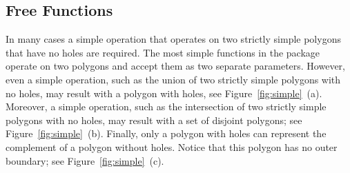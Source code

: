 
%
% 
% 
%

\subsection{Free Functions}
\label{bobs_ssec:free_functions}
In many cases a simple operation that operates on two strictly simple
polygons that have no holes are required. The most simple functions in
the package operate on two polygons and accept them as two separate
parameters. However, even a simple operation, such as the union of two
strictly simple polygons with no holes, may result with a polygon with
holes, see Figure~\ref{fig:simple}~(a). Moreover, a simple operation,
such as the intersection of two strictly simple polygons with no holes, 
may result with a set of disjoint polygons; see
Figure~\ref{fig:simple}~(b). Finally, only a polygon with holes can
represent the complement of a polygon without holes. Notice that this
polygon has no outer boundary; see Figure~\ref{fig:simple}~(c).


